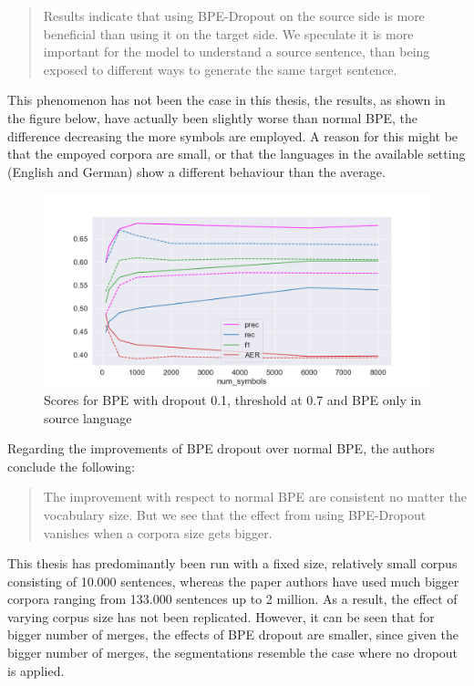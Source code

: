 \begin{quote}
	Results indicate that using BPE-Dropout on the source side is more beneficial than using it on the target side. We speculate it is more important for the model to understand a source sentence, than being exposed to different ways to generate the same target sentence.
\end{quote}

This phenomenon has not been the case in this thesis, the results, as shown in the figure below, have actually been slightly worse than normal BPE, the difference decreasing the more symbols are employed. A reason for this might be that the empoyed corpora are small, or that the languages in the available setting (English and German) show a different behaviour than the average.

\begin{figure}[!ht]
    \centering
    \includegraphics[width=11.5cm]{../reports/scores_dropout_bpe/space/0.1/0.7_thres_fastalign_eng.png}
    \caption{Scores for BPE with dropout 0.1, threshold at 0.7 and BPE only in source language}
\end{figure}

Regarding the improvements of BPE dropout over normal BPE, the authors conclude the following:

\begin{quote}
	The improvement with respect to normal BPE are consistent no matter the vocabulary size. But we see that the effect from using BPE-Dropout vanishes when a corpora size gets bigger.
\end{quote}

This thesis has predominantly been run with a fixed size, relatively small corpus consisting of 10.000 sentences, whereas the paper authors have used much bigger corpora ranging from 133.000 sentences up to 2 million. As a result, the effect of varying corpus size has not been replicated. However, it can be seen that for bigger number of merges, the effects of BPE dropout are smaller, since given the bigger number of merges, the segmentations resemble the case where no dropout is applied.

